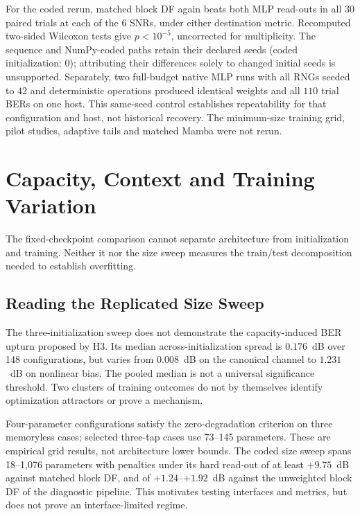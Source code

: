 For the coded rerun, matched block DF again beats both MLP read-outs in all $30$ paired trials at each of the $6$ SNRs, under either destination metric. Recomputed two-sided Wilcoxon tests give $p<10^{-5}$, uncorrected for multiplicity. The sequence and NumPy-coded paths retain their declared seeds (coded initialization: 0); attributing their differences solely to changed initial seeds is unsupported. Separately, two full-budget native MLP runs with all RNGs seeded to $42$ and deterministic operations produced identical weights and all $110$ trial BERs on one host. This same-seed control establishes repeatability for that configuration and host, not historical recovery. The minimum-size training grid, pilot studies, adaptive tails and matched Mamba were not rerun.

\section{Capacity, Context and Training Variation}\label{sec:capacity-and-overfitting}
\label{sec:information-theoretic-perspective}

The fixed-checkpoint comparison cannot separate architecture from initialization and training. Neither it nor the size sweep measures the train/test decomposition needed to establish overfitting.

\subsection{Reading the Replicated Size Sweep}\label{sec:complexity-curve-turn}

The three-initialization sweep does not demonstrate the capacity-induced BER upturn proposed by H3. Its median across-initialization spread is $0.176$~dB over 148 configurations, but varies from $0.008$~dB on the canonical channel to $1.231$~dB on nonlinear bias. The pooled median is not a universal significance threshold. Two clusters of training outcomes do not by themselves identify optimization attractors or prove a mechanism.

Four-parameter configurations satisfy the zero-degradation criterion on three memoryless cases; selected three-tap cases use 73--145 parameters. These are empirical grid results, not architecture lower bounds. The coded size sweep spans 18--1{,}076 parameters with penalties under its hard read-out of at least $+9.75$~dB against matched block DF, and of $+1.24$--$+1.92$~dB against the unweighted block DF of the diagnostic pipeline. This motivates testing interfaces and metrics, but does not prove an interface-limited regime.

